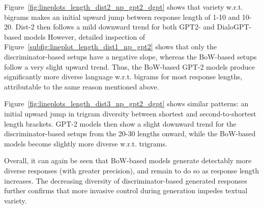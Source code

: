 Figure~\ref{fig:lineplots_length_dist2_np_gpt2_dgpt} shows that variety w.r.t. bigrams makes an initial upward jump between response length of 1-10 and 10-20. Dist-2 then follows a mild downward trend for both GPT2- and DialoGPT-based models However, detailed inspection of Figure~\ref{subfig:lineplot_length_dist1_np_gpt2} shows that only the discriminator-based setups have a negative slope, whereas the BoW-based setups follow a very slight upward trend. Thus, the BoW-based GPT-2 models produce significantly more diverse language w.r.t. bigrams for most response lengths, attributable to the same reason mentioned above.

Figure~\ref{fig:lineplots_length_dist3_np_gpt2_dgpt} shows similar patterns: an initial upward jump in trigram diversity between shortest and second-to-shortest length brackets. GPT-2 models then show a slight downward trend for the discriminator-based setups from the 20-30 lengths onward, while the BoW-based models become slightly more diverse w.r.t. trigrams.

Overall, it can again be seen that BoW-based models generate detectably more diverse responses (with greater precision), and remain to do so as response length increases. The decreasing diversity of discriminator-based generated responses further confirms that more invasive control during generation impedes textual variety.


